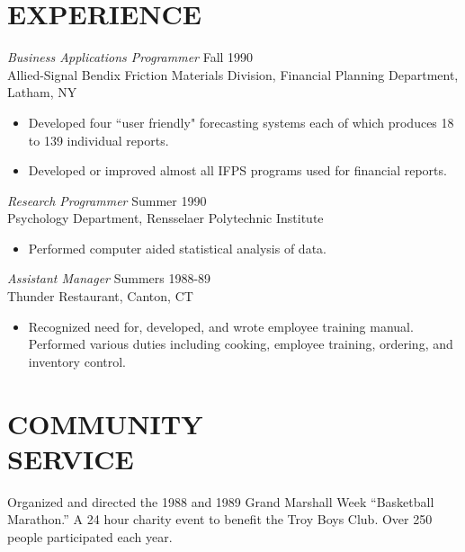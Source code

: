 \documentclass[margin]{res}
\begin{document}
\begin{resume}
\section{EXPERIENCE} {\sl Business Applications Programmer} \hfill Fall 1990 \\
                Allied-Signal Bendix Friction Materials Division, 
                Financial Planning Department, Latham, NY 
                 \begin{itemize}  \itemsep -2pt %
                 \item Developed four ``user friendly" forecasting 
                    systems each of which produces 18 to 139 
                    individual reports. 
                \item   Developed or improved almost all IFPS 
                    programs used for financial reports. 
                \end{itemize}
 
                {\sl Research Programmer} \hfill            Summer 1990 \\
                Psychology Department, Rensselaer Polytechnic 
                Institute 
                 \begin{itemize}  \itemsep -2pt %
                 \item Performed computer aided statistical analysis 
                    of data. 
                 \end{itemize} 
                {\sl Assistant Manager} \hfill        Summers 1988-89 \\
                Thunder Restaurant, Canton, CT
                  \begin{itemize}
                   \item Recognized need for, developed, and wrote 
                    employee training manual. Performed various 
                    duties including cooking, employee training, 
                    ordering, and inventory control. 
                   \end{itemize} 
 
\section{COMMUNITY \\ SERVICE}  Organized and directed the 1988 and 1989 Grand 
                 Marshall Week \newline ``Basketball Marathon.'' A 24 hour 
                charity event to benefit the Troy Boys Club. Over 
                250 people participated each year. 


\end{resume}
\end{document}
